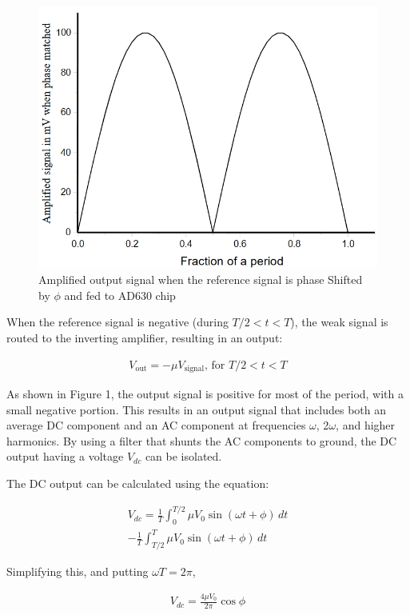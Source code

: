 \begin{figure}
    \centering
    \includegraphics[width=.7\columnwidth]{images/f2.png}
    \caption{Amplified output signal when the reference signal is phase
    Shifted by $\phi$ and fed to AD630 chip}
\end{figure}

When the reference signal is negative (during
$T/2 < t < T$), the weak signal is routed to the inverting amplifier, resulting in an output:

\begin{align}
    V_\text{out} = -\mu V_\text{signal}\text{, for } T/2 < t < T
\end{align}

As shown in Figure 1, the output signal is positive
for most of the period, with a small negative portion.
This results in an output signal that includes both
an average DC component and an AC component at
frequencies $\omega$, 2$\omega$, and higher harmonics. By using a
filter that shunts the AC components to ground, the
DC output having a voltage $V_{dc}$ can be isolated.

The DC output can be calculated using the equation:

\begin{align}
    V_{dc} = \frac{1}{T}\int_0^{T/2}\mu V_0 \sin(\omega t + \phi)\,dt \nonumber\\
     - \frac{1}{T}\int_{T/2}^{T}\mu V_0 \sin(\omega t + \phi)\,dt
\end{align}

Simplifying this, and putting $\omega T = 2\pi$,

\begin{align}
    V_{dc} = \frac{4\mu V_0}{2\pi} \cos \phi
\end{align}

